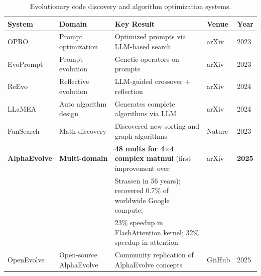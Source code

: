 \begin{table}[t]
\centering
\caption{Evolutionary code discovery and algorithm optimization systems.}
\label{tab:bench-evolutionary}
\begin{tabular}{@{}llp{60mm}ll@{}}
\toprule
\textbf{System} & \textbf{Domain} & \textbf{Key Result} & \textbf{Venue} & \textbf{Year} \\
\midrule
OPRO & Prompt optimization & Optimized prompts via LLM-based search & arXiv & 2023 \\
EvoPrompt & Prompt evolution & Genetic operators on prompts & arXiv & 2023 \\
ReEvo & Reflective evolution & LLM-guided crossover + reflection & arXiv & 2024 \\
LLaMEA & Auto algorithm design & Generates complete algorithms via LLM & arXiv & 2024 \\
FunSearch & Math discovery & Discovered new sorting and graph algorithms & Nature & 2023 \\
\textbf{AlphaEvolve} & \textbf{Multi-domain} & \textbf{48 mults for 4$\times$4 complex matmul} (first improvement over & arXiv & \textbf{2025} \\
 & & Strassen in 56 years); recovered 0.7\% of worldwide Google compute; & & \\
 & & 23\% speedup in FlashAttention kernel; 32\% speedup in attention & & \\
OpenEvolve & Open-source AlphaEvolve & Community replication of AlphaEvolve concepts & GitHub & 2025 \\
\bottomrule
\end{tabular}
\end{table}

